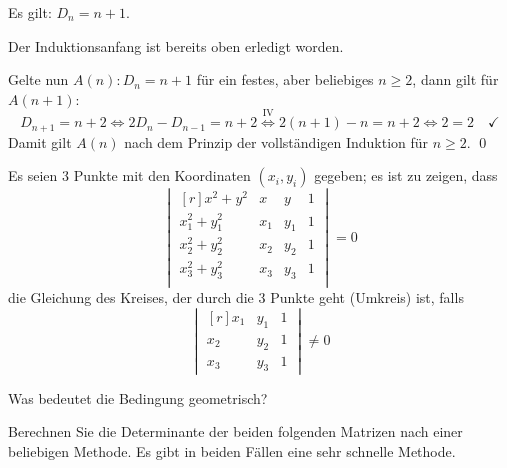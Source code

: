 \documentclass[answers]{exam}
\newcommand{\interval}[1]{\left[ #1 \right]}
\newcommand{\vektor}[1]{\begin{pmatrix*}[r] #1 \end{pmatrix*}}
\newcommand{\dvektor}[1]{\begin{vmatrix*}[r] #1 \end{vmatrix*}}
\newcommand{\N}{\mathbb{N}}
\begin{document}
\begin{questions}
\begin{parts}
\begin{solution}
            Es gilt: $D_n = n+1$.

            Der Induktionsanfang ist bereits oben erledigt worden.

            Gelte nun $A(n) : D_n = n+1$ für ein festes, aber beliebiges $n \geq 2$, dann gilt für $A(n+1)$:
            $$
                D_{n+1} = n + 2 \iff 2 D_n - D_{n-1} = n+2 \overset{\text{IV}}{\iff} 2(n+1) - n = n + 2 \iff 2 = 2 \quad \checkmark
            $$
            Damit gilt $A(n)$ nach dem Prinzip der vollständigen Induktion für $n \geq 2$. \qed
        \end{solution}
    \end{parts}

    \newpage
    \question
    Es seien 3 Punkte mit den Koordinaten $(x_i, y_i)$ gegeben; es ist zu zeigen, dass
    $$
        \dvektor{
            x^2 + y^2 & x & y & 1 \\
            x_1^2 + y_1^2 & x_1 & y_1 & 1 \\
            x_2^2 + y_2^2 & x_2 & y_2 & 1 \\
            x_3^2 + y_3^2 & x_3 & y_3 & 1 \\
        }
        = 0
    $$
    die Gleichung des Kreises, der durch die 3 Punkte geht (Umkreis) ist, falls
    $$
        \dvektor{
            x_1 & y_1 & 1 \\
            x_2 & y_2 & 1 \\
            x_3 & y_3 & 1
        }
        \neq 0
    $$

    Was bedeutet die Bedingung geometrisch?
    \begin{solution}
        
    \end{solution}

    \newpage 
    \question 
    Berechnen Sie die Determinante der beiden folgenden Matrizen nach einer beliebigen Methode. 
    Es gibt in beiden Fällen eine sehr schnelle Methode. 
\end{questions}
\end{document}
